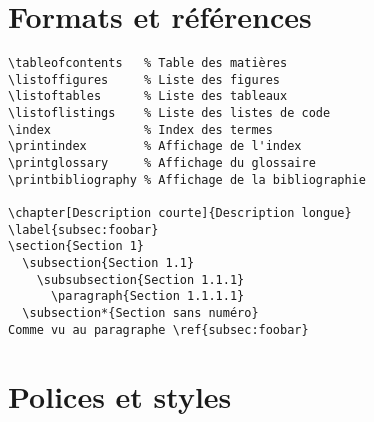 \documentclass{article}
\begin{document}
\begin{multicols*}{3}
\begin{lstlisting}
\end{lstlisting}

\section*{Formats et références}
\begin{lstlisting}
\tableofcontents   % Table des matières
\listoffigures     % Liste des figures
\listoftables      % Liste des tableaux
\listoflistings    % Liste des listes de code
\index             % Index des termes
\printindex        % Affichage de l'index
\printglossary     % Affichage du glossaire
\printbibliography % Affichage de la bibliographie

\chapter[Description courte]{Description longue}
\label{subsec:foobar}
\section{Section 1}
  \subsection{Section 1.1}
    \subsubsection{Section 1.1.1}
      \paragraph{Section 1.1.1.1}
  \subsection*{Section sans numéro}
Comme vu au paragraphe \ref{subsec:foobar}
\end{lstlisting}

\section*{Polices et styles}

\end{multicols*}
\end{document}
